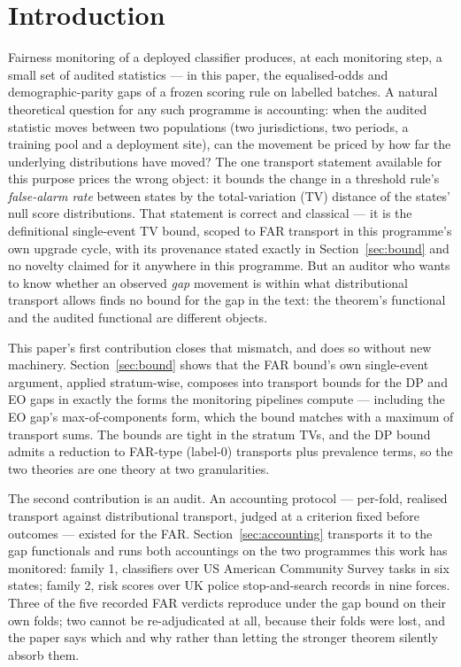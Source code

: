 \documentclass[11pt]{article}
\begin{document}
\section{Introduction}

Fairness monitoring of a deployed classifier produces, at each
monitoring step, a small set of audited statistics --- in this
paper, the equalised-odds and demographic-parity gaps of a frozen
scoring rule on labelled batches. A natural theoretical question
for any such programme is accounting: when the audited statistic
moves between two populations (two jurisdictions, two periods, a
training pool and a deployment site), can the movement be priced by
how far the underlying distributions have moved? The one transport statement available for this purpose prices the wrong object: it bounds the change in a threshold rule's \emph{false-alarm rate} between states by the total-variation (TV) distance of the states' null score distributions. That statement is correct and classical --- it is the definitional single-event TV bound, scoped to FAR transport in this programme's own upgrade cycle, with its provenance stated exactly in Section~\ref{sec:bound} and no novelty claimed for it anywhere in this programme. But an auditor who wants
to know whether an observed \emph{gap} movement is within what
distributional transport allows finds no bound for the gap in the
text: the theorem's functional and the audited functional are
different objects.

This paper's first contribution closes that mismatch, and does so
without new machinery. Section~\ref{sec:bound} shows that the FAR
bound's own single-event argument, applied stratum-wise, composes
into transport bounds for the DP and EO gaps in exactly the forms
the monitoring pipelines compute --- including the EO gap's
max-of-components form, which the bound matches with a maximum of
transport sums. The bounds are tight in the stratum TVs, and the DP
bound admits a reduction to FAR-type (label-0) transports plus
prevalence terms, so the two theories are one theory at two
granularities.

The second contribution is an audit. An accounting protocol ---
per-fold, realised transport against distributional transport,
judged at a criterion fixed before outcomes --- existed for the
FAR. Section~\ref{sec:accounting} transports it to the gap
functionals and runs both accountings on the two programmes this
work has monitored: family 1, classifiers over US American
Community Survey tasks in six states; family 2, risk scores over UK
police stop-and-search records in nine forces. Three of the five
recorded FAR verdicts reproduce under the gap bound on their own
folds; two cannot be re-adjudicated at all, because their folds
were lost, and the paper says which and why rather than letting the
stronger theorem silently absorb them.
\end{document}
